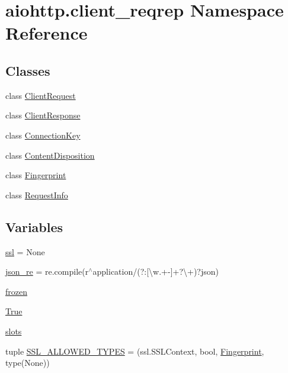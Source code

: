 \hypertarget{namespaceaiohttp_1_1client__reqrep}{}\section{aiohttp.\+client\+\_\+reqrep Namespace Reference}
\label{namespaceaiohttp_1_1client__reqrep}
\subsection*{Classes}
\begin{DoxyCompactItemize}
\item 
class \hyperlink{classaiohttp_1_1client__reqrep_1_1_client_request}{Client\+Request}
\item 
class \hyperlink{classaiohttp_1_1client__reqrep_1_1_client_response}{Client\+Response}
\item 
class \hyperlink{classaiohttp_1_1client__reqrep_1_1_connection_key}{Connection\+Key}
\item 
class \hyperlink{classaiohttp_1_1client__reqrep_1_1_content_disposition}{Content\+Disposition}
\item 
class \hyperlink{classaiohttp_1_1client__reqrep_1_1_fingerprint}{Fingerprint}
\item 
class \hyperlink{classaiohttp_1_1client__reqrep_1_1_request_info}{Request\+Info}
\end{DoxyCompactItemize}
\subsection*{Variables}
\begin{DoxyCompactItemize}
\item 
\hyperlink{namespaceaiohttp_1_1client__reqrep_a59aac5599efd0d44d530ff1a2794aa8a}{ssl} = None
\item 
\hyperlink{namespaceaiohttp_1_1client__reqrep_a9b0b827a7f25a7ba4ff8ec1328969baa}{json\+\_\+re} = re.\+compile(r\textquotesingle{}$^\wedge$application/(?\+:\mbox{[}\textbackslash{}w.+-\/\mbox{]}+?\textbackslash{}+)?json\textquotesingle{})
\item 
\hyperlink{namespaceaiohttp_1_1client__reqrep_a51911b6906746bc8c99466c1c6143c05}{frozen}
\item 
\hyperlink{namespaceaiohttp_1_1client__reqrep_a88589dae6cf40e888e0f0996babebc49}{True}
\item 
\hyperlink{namespaceaiohttp_1_1client__reqrep_adfac62becf4f05e90859ab9a57c84a2f}{slots}
\item 
tuple \hyperlink{namespaceaiohttp_1_1client__reqrep_a00e27edf2c18985370de5016d1a704a3}{S\+S\+L\+\_\+\+A\+L\+L\+O\+W\+E\+D\+\_\+\+T\+Y\+P\+ES} = (ssl.\+S\+S\+L\+Context, bool, \hyperlink{classaiohttp_1_1client__reqrep_1_1_fingerprint}{Fingerprint}, type(None))
\end{DoxyCompactItemize}


